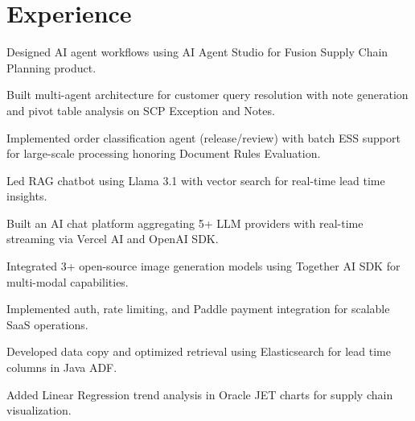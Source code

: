 \documentclass[]{deedy-resume-openfont}
\begin{document}
\hfill
\begin{minipage}[t]{0.66\textwidth}


\section{Experience}

\vspace{\topsep}
\begin{tightemize}
\item Designed AI agent workflows using AI Agent Studio for Fusion Supply Chain Planning product.
\item Built multi-agent architecture for customer query resolution with note generation and pivot table analysis on SCP Exception and Notes.
\item Implemented order classification agent (release/review) with batch ESS support for large-scale processing honoring Document Rules Evaluation.
\item Led RAG chatbot using Llama 3.1 with vector search for real-time lead time insights.
\end{tightemize}
\sectionsep

\begin{tightemize}
\item Built an AI chat platform aggregating 5+ LLM providers with real-time streaming via Vercel AI and OpenAI SDK.
\item Integrated 3+ open-source image generation models using Together AI SDK for multi-modal capabilities.
\item Implemented auth, rate limiting, and Paddle payment integration for scalable SaaS operations.
\end{tightemize}
\sectionsep

\begin{tightemize}
\item Developed data copy and optimized retrieval using Elasticsearch for lead time columns in Java ADF.
\item Added Linear Regression trend analysis in Oracle JET charts for supply chain visualization.
\end{tightemize}
\sectionsep


\end{minipage}
\end{document}
